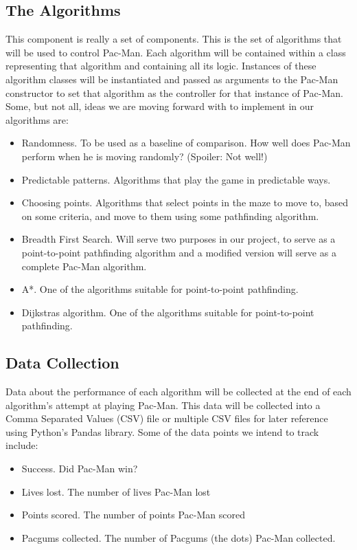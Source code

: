 \documentclass[12pt]{article}
\begin{document}
    \subsection*{The Algorithms}
      This component is really a set of components. This is the set of algorithms that will be used to control Pac-Man. Each algorithm will be contained within a class representing that algorithm and containing all its logic. Instances of these algorithm classes will be instantiated and passed as arguments to the Pac-Man constructor to set that algorithm as the controller for that instance of Pac-Man. Some, but not all, ideas we are moving forward with to implement in our algorithms are:
      \begin{itemize}
        \itemsep0pt
          \item Randomness. To be used as a baseline of comparison. How well does Pac-Man perform when he is moving randomly? (Spoiler: Not well!)
          \item Predictable patterns. Algorithms that play the game in predictable ways.
          \item Choosing points. Algorithms that select points in the maze to move to, based on some criteria, and move to them using some pathfinding algorithm.
          \item Breadth First Search. Will serve two purposes in our project, to serve as a point-to-point pathfinding algorithm and a modified version will serve as a complete Pac-Man algorithm.
          \item A*. One of the algorithms suitable for point-to-point pathfinding.
          \item Dijkstras algorithm. One of the algorithms suitable for point-to-point pathfinding.
      \end{itemize}
    \subsection*{Data Collection}
      Data about the performance of each algorithm will be collected at the end of each algorithm's attempt at playing Pac-Man. This data will be collected into a Comma Separated Values (CSV) file or multiple CSV files for later reference using Python's Pandas library. Some of the data points we intend to track include:
      \begin{itemize}
        \itemsep0pt
        \item Success. Did Pac-Man win?
        \item Lives lost. The number of lives Pac-Man lost
        \item Points scored. The number of points Pac-Man scored
        \item Pacgums collected. The number of Pacgums (the dots) Pac-Man collected.
      \end{itemize}
\end{document}
